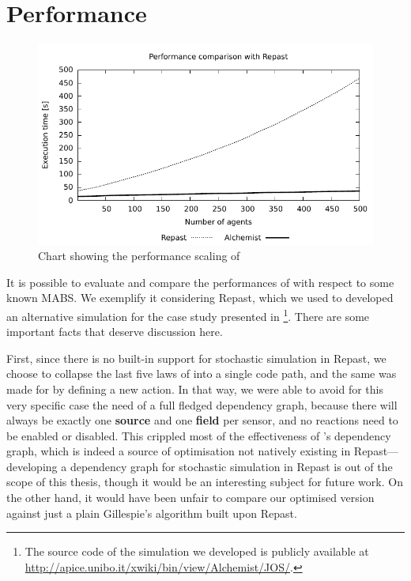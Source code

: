 \documentclass[12pt,a4paper,twoside,openright]{book}
\begin{document}
\section{Performance}

\begin{figure}[t]
    \includegraphics[width=0.999999\columnwidth]{img/jos-graph01}
    \caption{Chart showing the performance scaling of \alchemist{}}
    \label{img:repastperf}
\end{figure}

It is possible to evaluate and compare the performances of \alchemist{} with respect to some known MABS.
%
We exemplify it considering Repast, which we used to developed an alternative simulation for the case study presented in \footnote{The source code of the simulation we developed is publicly available at \mbox{\url{http://apice.unibo.it/xwiki/bin/view/Alchemist/JOS/}.}}. There are some important facts that deserve discussion here.

First, since there is no built-in support for stochastic simulation in Repast, we choose to collapse the last five laws of  into a single code path, and the same was made for \alchemist{} by defining a new action.
%
In that way, we were able to avoid for this very specific case the need of a full fledged dependency graph, because there will always be exactly one \textbf{source} and one \textbf{field} per sensor, and no reactions need to be enabled or disabled.
%
This crippled most of the effectiveness of \alchemist{}'s dependency graph, which is indeed a source of optimisation not natively existing in Repast---developing a dependency graph for stochastic simulation in Repast is out of the scope of this thesis, though it would be an interesting subject for future work.
%
On the other hand, it would have been unfair to compare our optimised version against just a plain Gillespie's algorithm built upon Repast.
\end{document}
